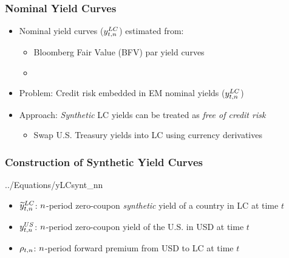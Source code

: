 \documentclass[12pt, aspectratio=169, xcolor=dvipsnames]{beamer} 			         %
\begin{document}
\begin{frame}
	\frametitle{\textbf{Nominal} Yield Curves}
	\begin{itemize}
		\item Nominal yield curves ($y_{t,n} ^{LC}$) estimated from:
		\begin{itemize}
			\item Bloomberg Fair Value (BFV) par yield curves
			\item \cite{NelsonSiegel:1987}
		\end{itemize}
		\item \alert{Problem:} Credit risk embedded in EM nominal yields ($y_{t,n} ^{LC}$)
		\item \alert{Approach:} \textit{Synthetic} LC yields can be treated as \textit{free of credit risk}
		\begin{itemize}
			\item Swap U.S. Treasury yields into LC using currency derivatives
		\end{itemize}
	\end{itemize}
\end{frame}

\begin{frame}
	\frametitle{Construction of \textbf{Synthetic} Yield Curves}
	\vspace{-1cm}
	 {../Equations/yLCsynt_nn}
	\vspace{-0.5cm}
	\begin{itemize}
		\item $\widetilde{y}_{t,n} ^{LC}$: $n$-period zero-coupon \textit{synthetic} yield of a country in LC at time $t$
		\item $y_{t,n} ^{US}$: $n$-period zero-coupon yield of the U.S. in USD at time $t$
		\item $\rho_{t,n}$: $n$-period \alert{forward premium} from USD to LC at time $t$
	\end{itemize}
\end{frame}
\end{document}
